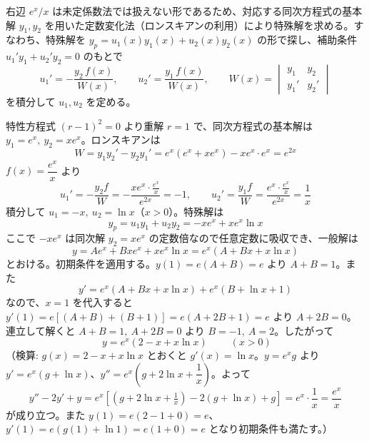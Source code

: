 
右辺 $e^{x}/x$ は未定係数法では扱えない形であるため、対応する同次方程式の基本解 $y_{1}, y_{2}$ を用いた定数変化法（ロンスキアンの利用）により特殊解を求める。すなわち、特殊解を $y_{p} = u_{1}(x)y_{1}(x) + u_{2}(x)y_{2}(x)$ の形で探し、補助条件 $u_{1}'y_{1} + u_{2}'y_{2} = 0$ のもとで
\[
u_{1}' = -\frac{y_{2}\,f(x)}{W(x)}, \qquad u_{2}' = \frac{y_{1}\,f(x)}{W(x)}, \qquad W(x) = \begin{vmatrix} y_{1} & y_{2} \\ y_{1}' & y_{2}' \end{vmatrix}
\]
を積分して $u_{1}, u_{2}$ を定める。

特性方程式 $(r-1)^{2}=0$ より重解 $r=1$ で、同次方程式の基本解は $y_{1}=e^{x},\ y_{2}=xe^{x}$。ロンスキアンは
\[
W = y_{1}y_{2}' - y_{2}y_{1}' = e^{x}(e^{x}+xe^{x}) - xe^{x}\cdot e^{x} = e^{2x}
\]
$f(x)=\dfrac{e^{x}}{x}$ より
\[
u_{1}' = -\frac{y_{2}f}{W} = -\frac{xe^{x}\cdot \frac{e^{x}}{x}}{e^{2x}} = -1,
\qquad
u_{2}' = \frac{y_{1}f}{W} = \frac{e^{x}\cdot\frac{e^{x}}{x}}{e^{2x}} = \frac{1}{x}
\]
積分して $u_{1} = -x,\ u_{2} = \ln x$（$x>0$）。特殊解は
\[
y_{p} = u_{1}y_{1}+u_{2}y_{2} = -xe^{x} + xe^{x}\ln x
\]
ここで $-xe^{x}$ は同次解 $y_{2}=xe^{x}$ の定数倍なので任意定数に吸収でき、一般解は
\[
y = Ae^{x} + Bxe^{x} + xe^{x}\ln x = e^{x}\left(A + Bx + x\ln x\right)
\]
とおける。初期条件を適用する。$y(1) = e(A+B) = e$ より $A+B=1$。また
\[
y' = e^{x}(A+Bx+x\ln x) + e^{x}(B+\ln x + 1)
\]
なので、$x=1$ を代入すると $y'(1)=e\left[(A+B)+(B+1)\right]=e(A+2B+1)=e$ より $A+2B=0$。連立して解くと $A+B=1,\ A+2B=0$ より $B=-1,\ A=2$。したがって
\[
\boxed{\; y = e^{x}\left(2 - x + x\ln x\right) \;} \qquad (x>0)
\]
（検算: $g(x)=2-x+x\ln x$ とおくと $g'(x)=\ln x$。$y=e^{x}g$ より $y'=e^{x}(g+\ln x)$、$y''=e^{x}\left(g+2\ln x+\dfrac{1}{x}\right)$。よって
\[
y''-2y'+y = e^{x}\left[\left(g+2\ln x+\tfrac{1}{x}\right)-2(g+\ln x)+g\right] = e^{x}\cdot\frac{1}{x} = \frac{e^{x}}{x}
\]
が成り立つ。また $y(1)=e(2-1+0)=e$、$y'(1)=e(g(1)+\ln 1)=e(1+0)=e$ となり初期条件も満たす。）
